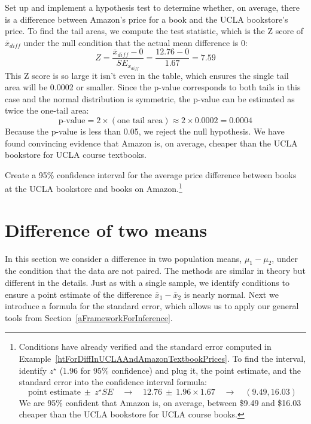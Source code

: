 \begin{example}{Set up and implement a hypothesis test to determine whether, on average, there is a difference between Amazon's price for a book and the UCLA bookstore's price.}
To find the tail areas, we compute the test statistic, which is the Z score of $\bar{x}_{diff}$ under the null condition that the actual mean difference is 0:
$$Z = \frac{\bar{x}_{diff} - 0}{SE_{x_{diff}}} = \frac{12.76 - 0}{1.67} = 7.59$$
This Z score is so large it isn't even in the table, which ensures the single tail area will be 0.0002 or smaller. Since the p-value corresponds to both tails in this case and the normal distribution is symmetric, the p-value can be estimated as twice the one-tail area:
$$\text{p-value} = 2\times (\text{one tail area}) \approx 2\times 0.0002 = 0.0004$$
Because the p-value is less than 0.05, we reject the null hypothesis. We have found convincing evidence that Amazon is, on average, cheaper than the UCLA bookstore for UCLA course textbooks.
\end{example}

\begin{exercise}
Create a 95\% confidence interval for the average price difference between books at the UCLA bookstore and books on Amazon.\footnote{Conditions have already verified and the standard error computed in Example~\ref{htForDiffInUCLAAndAmazonTextbookPrices}. To find the interval, identify $z^{\star}$ (1.96 for 95\% confidence) and plug it, the point estimate, and the standard error into the confidence interval formula:
$$\text{point estimate} \ \pm\ z^{\star}SE \quad\to\quad 12.76 \ \pm\ 1.96\times 1.67 \quad\to\quad (9.49, 16.03)$$
We are 95\% confident that Amazon is, on average, between \$9.49 and \$16.03 cheaper than the UCLA bookstore for UCLA course books.}


\end{exercise}


\section{Difference of two means}
\label{differenceOfTwoMeans}

In this section we consider a difference in two population means, $\mu_1 - \mu_2$, under the condition that the data are not paired. The methods are similar in theory but different in the details. Just as with a single sample, we identify conditions to ensure a point estimate of the difference $\bar{x}_1 - \bar{x}_2$ is nearly normal. Next we introduce a formula for the standard error, which allows us to apply our general tools from Section~\ref{aFrameworkForInference}.

